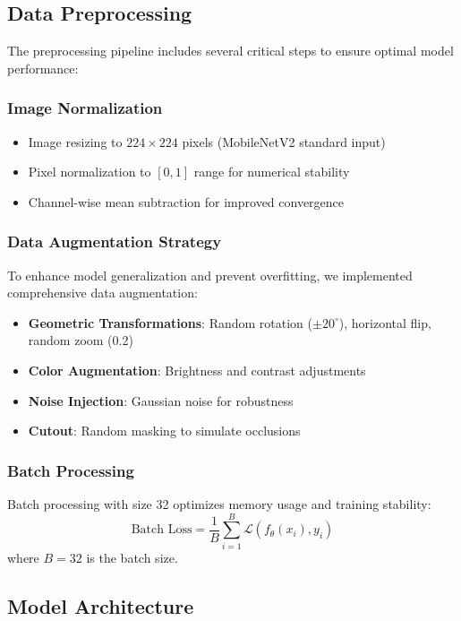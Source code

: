 \documentclass[conference,10pt,letterpaper]{IEEEtran}
\begin{document}
\subsection{Data Preprocessing}

The preprocessing pipeline includes several critical steps to ensure optimal model performance:

\subsubsection{Image Normalization}
\begin{itemize}
\item Image resizing to $224 \times 224$ pixels (MobileNetV2 standard input)
\item Pixel normalization to $[0,1]$ range for numerical stability
\item Channel-wise mean subtraction for improved convergence
\end{itemize}

\subsubsection{Data Augmentation Strategy}
To enhance model generalization and prevent overfitting, we implemented comprehensive data augmentation:
\begin{itemize}
\item \textbf{Geometric Transformations}: Random rotation ($\pm20^\circ$), horizontal flip, random zoom (0.2)
\item \textbf{Color Augmentation}: Brightness and contrast adjustments
\item \textbf{Noise Injection}: Gaussian noise for robustness
\item \textbf{Cutout}: Random masking to simulate occlusions
\end{itemize}

\subsubsection{Batch Processing}
Batch processing with size 32 optimizes memory usage and training stability:
\begin{equation}
\text{Batch Loss} = \frac{1}{B} \sum_{i=1}^{B} \mathcal{L}(f_{\theta}(x_i), y_i)
\end{equation}
where $B = 32$ is the batch size.

\subsection{Model Architecture}
\end{document}
